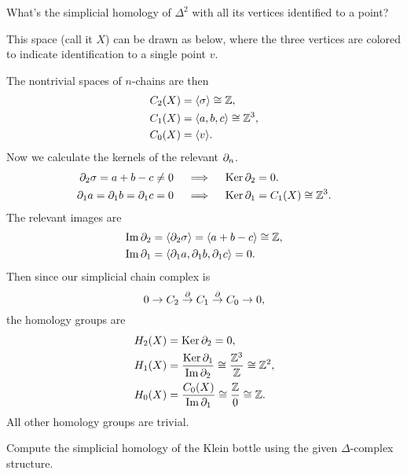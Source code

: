 \documentclass[twoside,10pt]{article}
\begin{document}
\vspace{2in}

\newpage

\begin{exer}[2.1: 4]
What's the simplicial homology of $\Delta^{2}$ with all its vertices identified to a point?
\end{exer}

This space (call it $X$) can be drawn as below, where the three vertices are colored to indicate identification to a single point $v$.

\vspace{2in}

The nontrivial spaces of $n$-chains are then
\begin{align*}
	C_2(X) &= \langle \sigma \rangle \cong \mathbb{Z}, \\
	C_1(X) &= \langle a,b,c \rangle \cong \mathbb{Z}^{3}, \\
	C_0(X) &= \langle v \rangle.
\end{align*}
Now we calculate the kernels of the relevant $\partial_{n}{} $.
\begin{align*}
	\partial_{2}{\sigma} = a+b-c \neq 0 \quad &\implies \quad \operatorname{Ker} \partial_{2}{} =0. \\
	\partial_{1}{a} =\partial_{1}{b} =\partial_{1}{c} = 0 \quad & \implies \quad \operatorname{Ker} \partial_{1}{} =C_1(X) \cong \mathbb{Z}^{3}.
\end{align*}
The relevant images are
\begin{align*}
	\operatorname{Im} \partial_{2}{} &= \langle \partial_{2}{\sigma}  \rangle = \langle a+b-c \rangle \cong \mathbb{Z},\\
	\operatorname{Im} \partial_{1}{} &= \langle \partial_{1}{a} ,\partial_{1}{b} ,\partial_{1}{c}  \rangle = 0.
\end{align*}
Then since our simplicial chain complex is
\[
0 \to C_2 \stackrel{\partial}{\to } C_1 \stackrel{\partial}{\to } C_0 \to 0,
\] the homology groups are
\begin{align*}
	H_2(X) &= \operatorname{Ker} \partial_2 = 0,\\
	H_1(X) &= \frac{\operatorname{Ker} \partial_1}{\operatorname{Im} \partial_2} \cong \frac{\mathbb{Z}^{3}}{\mathbb{Z}} \cong \mathbb{Z}^{2},\\
	H_0(X) &= \frac{C_0(X)}{\operatorname{Im} \partial_1} \cong \frac{\mathbb{Z}}{0} \cong \mathbb{Z}.
\end{align*}
All other homology groups are trivial.

\newpage

\begin{exer}[2.1: 5]
Compute the simplicial homology of the Klein bottle using the given $\Delta$-complex structure.
\end{exer}
\end{document}
